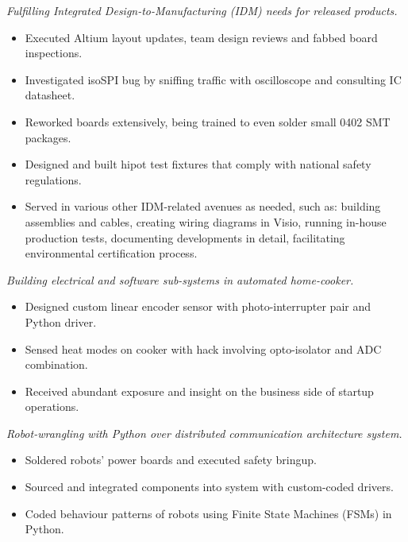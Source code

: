 \documentclass{resume}
\begin{document}
\textit{Fulfilling Integrated Design-to-Manufacturing (IDM) needs for released products.}
\begin{itemize}
  \item Executed Altium layout updates, team design reviews and fabbed board inspections.
  \item Investigated isoSPI bug by sniffing traffic with oscilloscope and consulting IC datasheet.
  \item Reworked boards extensively, being trained to even solder small 0402 SMT packages.
  \item Designed and built hipot test fixtures that comply with national safety regulations.
  \item Served in various other IDM-related avenues as needed, such as: building assemblies and cables, creating wiring diagrams in Visio, running in-house production tests, documenting developments in detail, facilitating environmental certification process.
\end{itemize}

\textit{Building electrical and software sub-systems in automated home-cooker.}
\begin{itemize}
  \item Designed custom linear encoder sensor with photo-interrupter pair and Python driver.
  \item Sensed heat modes on cooker with hack involving opto-isolator and ADC combination.
  \item Received abundant exposure and insight on the business side of startup operations.
\end{itemize}

\textit{Robot-wrangling with Python over distributed communication architecture system.}
\begin{itemize}
  \item Soldered robots' power boards and executed safety bringup.
  \item Sourced and integrated components into system with custom-coded drivers.
  \item Coded behaviour patterns of robots using Finite State Machines (FSMs) in Python.
\end{itemize}
\begin{comment}
  Informal intro to ML / N-nets, FK / IK, Grasping, FSM, DB (ES)
  People skills: pair-programming, 1-on-1, standups, blog posts, Happy Hour, AI planning, CI for internal processes, HW concept review
  Python fu: rapid prototyping / scripting AND enterprise-level code --> classes, exception-handling, logging, PDB debugging, linting, documentation
\end{comment}
\end{document}
